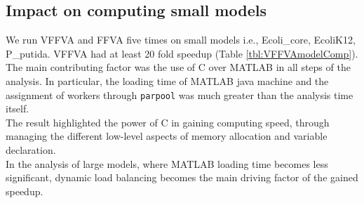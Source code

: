 \subsection{Impact on computing small models}
We run VFFVA and FFVA five times on small models i.e., Ecoli\_core, EcoliK12, P\_putida. VFFVA had at least 20 fold speedup (Table \ref{tbl:VFFVAmodelComp}). The main contributing factor was the use of C over MATLAB in all steps of the analysis. In particular, the loading time of MATLAB java machine and the assignment of workers through \texttt{parpool} was much greater than the analysis time itself.\\
The result highlighted the power of C in gaining computing speed, through managing the different low-level aspects of memory allocation and variable declaration.\\
In the analysis of large models, where MATLAB loading time becomes less significant, dynamic load balancing becomes the main driving factor of the gained speedup.\\ 
